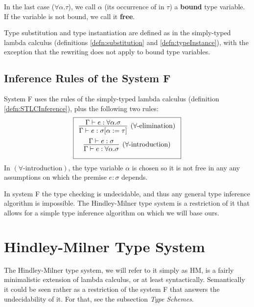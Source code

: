 In the last case ($\forall \alpha . \tau$), we call $\alpha$ (its occurrence of in $\tau$) a \textbf{bound} type variable. If the variable is not bound, we call it \textbf{free}.

\begin{defn}
    \label{ssec:substitutionF}
    Type substitution and type instantiation are defined as in the simply-typed lambda calculus (definitions \ref{defn:substitution} and \ref{defn:typeInstance}), with the exception that the rewriting does not apply to bound type variables.
\end{defn}

\subsection{Inference Rules of the System F}

\begin{defn}
    System F uses the rules of the simply-typed lambda calculus (definition \ref{defn:STLCInference}), plus the following two rules:
    $$\boxed{\renewcommand{\arraystretch}{2.2}\begin{array}{c}
        \infer[\text{($\forall$-elimination)}]{\Gamma \vdash e : \sigma [\alpha := \tau]}{\Gamma \vdash e : \forall \alpha . \sigma} \\
        \infer[\text{($\forall$-introduction)}]{\Gamma \vdash e : \forall \alpha . \sigma}{\Gamma \vdash e : \sigma}
    \end{array}}$$
    In $(\text{$\forall$-introduction})$, the type variable $\alpha$ is chosen so it is not free in any any assumptions on which the premise $e : \sigma$ depends.
\end{defn}

In system F the type checking is undecidable, and thus any general type inference algorithm is impossible. The Hindley-Milner type system is a restriction of it that allows for a simple type inference algorithm on which we will base ours.

\section{Hindley-Milner Type System}

The Hindley-Milner type system, we will refer to it simply as HM, is a fairly minimalistic extension of lambda calculus, or at least syntactically. Semantically it could be seen rather as a restriction of the system F that answers the undecidability of it. For that, see the subsection \emph{Type Schemes}.

